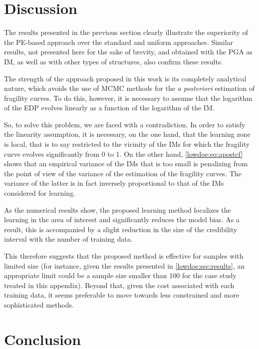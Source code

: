 \section{Discussion}\label{lowdoe:sec:discussion}

The results presented in the previous section clearly illustrate the superiority of the PE-based approach over the standard {and uniform} approaches. Similar results, not presented here for the sake of brevity, and obtained with the PGA as IM, as well as with other types of structures, also confirm these results.

The strength of the approach proposed in this work is its completely analytical nature, which avoids the use of MCMC methods for the \emph{a posteriori} estimation of fragility curves. To do this, however, it is necessary to assume that the logarithm of the EDP evolves linearly as a function of the logarithm of the IM.

So, to solve this problem, we are faced with a contradiction. In order to satisfy the linearity assumption, it is necessary, on the one hand, that the learning zone is local, that is to say restricted to the vicinity of the IMs for which the fragility curve evolves significantly from 0 to 1. On the other hand, \cref{lowdoe:eq:apostcf} shows that an empirical variance of the IMs that is too small is penalizing from the point of view of the variance of the estimation of the fragility curves. The variance of the latter is in fact inversely proportional to that of the IMs considered for learning.

As the numerical results show, the proposed learning method localizes the learning in the area of interest and significantly reduces the model bias. As a result, this is accompanied by a slight reduction in the size of the credibility interval with the number of training data.

This therefore suggests that the proposed method is effective for samples
with limited size (for instance, given the results presented in \cref{lowdoe:sec:results}, an appropriate limit could be a sample size smaller than 100 for the case study treated in this appendix). Beyond that, given the cost associated with each training data, it seems preferable to move towards less constrained and more sophisticated methods.

\section{Conclusion}\label{lowdoe:sec:conclusion}


